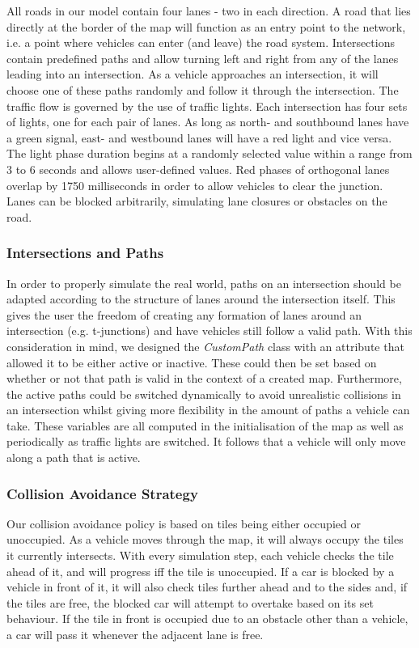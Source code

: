 All roads in our model contain four lanes - two in each direction. A road that lies directly at the border of the map will function as an entry point to the network, i.e. a point where vehicles can enter (and leave) the road system. Intersections contain predefined paths and allow turning left and right from any of the lanes leading into an intersection. As a vehicle approaches an intersection, it will choose one of these paths randomly and follow it through the intersection. The traffic flow is governed by the use of traffic lights. Each intersection has four sets of lights, one for each pair of lanes. As long as north- and southbound lanes have a green signal, east- and westbound lanes will have a red light and vice versa. The light phase duration begins at a randomly selected value within a range from 3 to 6 seconds and allows user-defined values. Red phases of orthogonal lanes overlap by 1750 milliseconds in order to allow vehicles to clear the junction. Lanes can be blocked arbitrarily, simulating lane closures or obstacles on the road.

\subsubsection*{Intersections and Paths}
In order to properly simulate the real world, paths on an intersection should be adapted according to the structure of lanes around the intersection itself. This gives the user the freedom of creating any formation of lanes around an intersection (e.g. t-junctions) and have vehicles still follow a valid path. With this consideration in mind, we designed the \textit{CustomPath} class with an attribute that allowed it to be either active or inactive. These could then be set based on whether or not that path is valid in the context of a created map. Furthermore, the active paths could be switched dynamically to avoid unrealistic collisions in an intersection whilst giving more flexibility in the amount of paths a vehicle can take. These variables are all computed in the initialisation of the map as well as periodically as traffic lights are switched. It follows that a vehicle will only move along a path that is active.



\subsubsection*{Collision Avoidance Strategy}

Our collision avoidance policy is based on tiles being either occupied or unoccupied. As a vehicle moves through the map, it will always occupy the tiles it currently intersects. With every simulation step, each vehicle checks the tile ahead of it, and will progress iff the tile is unoccupied. If a car is blocked by a vehicle in front of it, it will also check tiles further ahead and to the sides and, if the tiles are free, the blocked car will attempt to overtake based on its set behaviour. If the tile in front is occupied due to an obstacle other than a vehicle, a car will pass it whenever the adjacent lane is free.

